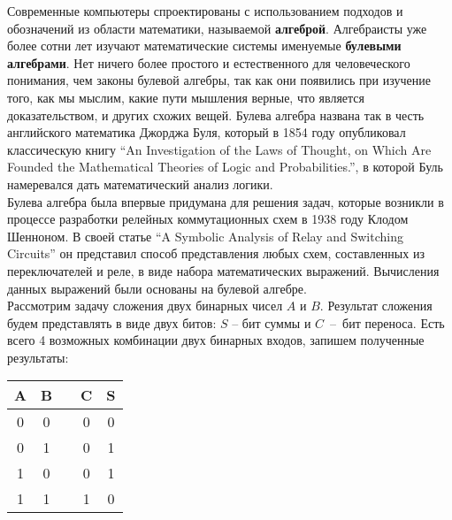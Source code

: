 




Современные компьютеры спроектированы с использованием подходов и обозначений из области математики, называемой \textbf{алгеброй}. Алгебраисты уже более сотни лет изучают математические системы именуемые \textbf{булевыми алгебрами}. Нет ничего более простого и естественного для человеческого понимания, чем законы булевой алгебры, так как они появились при изучение того, как мы мыслим, какие пути мышления верные, что является доказательством, и других схожих вещей. Булева алгебра названа так в честь английского математика Джорджа Буля, который в 1854 году опубликовал классическую книгу ``An Investigation of the Laws of Thought, on Which Are Founded the Mathematical Theories of Logic and Probabilities.'', в которой Буль намеревался дать математический анализ логики. \\

Булева алгебра была впервые придумана для решения задач, которые возникли в процессе разработки релейных коммутационных схем в 1938 году Клодом Шенноном. В своей статье ``A Symbolic Analysis of Relay and Switching Circuits'' он представил способ представления любых схем, составленных из переключателей и реле, в виде набора математических выражений. Вычисления данных выражений были основаны на булевой алгебре. \\

Рассмотрим задачу сложения двух бинарных чисел $A$ и $B$. Результат сложения будем представлять в виде двух битов: $S$ – бит суммы и $C$ – бит переноса. Есть всего 4 возможных комбинации двух бинарных входов, запишем полученные результаты: \\

\begin{center}
\begin{tabular}{c c c c c}
\hline
A & B & & C & S \\
\hline \hline
0 & 0 & & 0 & 0 \\
0 & 1 & & 0 & 1 \\
1 & 0 & & 0 & 1 \\
1 & 1 & & 1 & 0 \\
\end{tabular}
\end{center}
\

